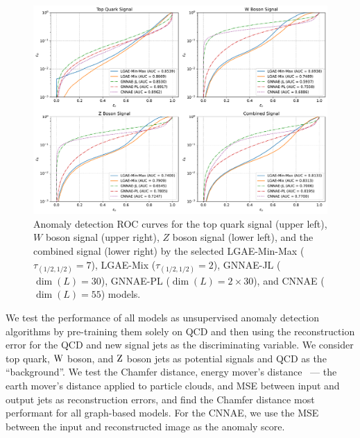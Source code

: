 \begin{figure}[ht!]
    \centering
    \includegraphics[width=\linewidth]{figures/06-ML4Jets/lgae/anomaly/roc_curves-cnnae.pdf}
    \caption[Anomaly detection ROC curves for the LGAE, GNNAE, and CNNAE models.]{
        Anomaly detection ROC curves for
        the top quark signal (upper left),
        $W$ boson signal (upper right),
        $Z$ boson signal (lower left),
        and the combined signal (lower right)
        by the selected
        LGAE-Min-Max ($\tau_{(1/2, 1/2)} = 7$),
        LGAE-Mix ($\tau_{(1/2, 1/2)}=2$),
        GNNAE-JL ($\dim(L) = 30$),
        GNNAE-PL ($\dim(L) = 2 \times 30$),
        and CNNAE ($\dim(L) = 55$)
        models.
    }
    \label{fig:06_lgae_roc-each}
\end{figure}

We test the performance of all models as unsupervised anomaly detection algorithms by pre-training them solely on QCD and then using the reconstruction error for the QCD and new signal jets as the discriminating variable.
We consider top quark, $\textrm{W}$ boson, and $\textrm{Z}$ boson jets as potential signals and QCD as the ``background''.
We test the Chamfer distance, energy mover's distance~\cite{Komiske:2019fks} --- the earth mover's distance applied to particle clouds, and MSE between input and output jets as reconstruction errors, and find the Chamfer distance most performant for all graph-based models.
For the CNNAE, we use the MSE between the input and reconstructed image as the anomaly score.

